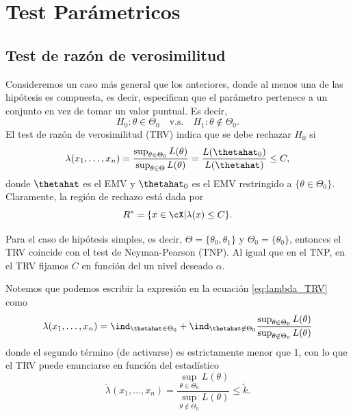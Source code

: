 \section{Test Parámetricos}

\subsection{Test de razón de verosimilitud} 
\label{sub:test_de_RV}

Consideremos un caso más general que los anteriores, donde al menos una de las hipótesis es compuesta, es decir, especifican que el parámetro pertenece a un conjunto en vez de tomar un valor puntual. Es decir, 
\begin{equation}
		H_0:\theta \in\Theta_0\quad \text{v.s.}\quad H_1:\theta \notin\Theta_0.
	\end{equation}
El test de razón de verosimilitud (TRV) indica que se debe rechazar $H_0$ si 
\begin{equation}
	\label{eq:lambda_TRV}
	\lambda(x_1,\ldots,x_n) = \frac{\sup_{\theta\in\Theta_0}L(\theta)}{\sup_{\theta\in\Theta}L(\theta)}
							= \frac{L(\thetahat_0)}{L(\thetahat)}\leq C,
\end{equation}
donde $\thetahat$ es el EMV y $\thetahat_0$ es el EMV restringido a $\{\theta\in\Theta_0\}$. Claramente, la región de rechazo está dada por 
\begin{equation}
	R^* = \{x\in\cX|\lambda(x)\leq C\}.
\end{equation}
\begin{remark}
	Para el caso de hipótesis simples, es decir, $\Theta = \{\theta_0,\theta_1\}$ y $\Theta_0 = \{\theta_0\}$, entonces el TRV coincide con el test de Neyman-Pearson (TNP). Al igual que en el TNP, en el TRV fijamos $C$ en función del un nivel deseado $\alpha$. 
\end{remark}


\begin{remark}
	Notemos que podemos escribir la expresión en la ecuación \eqref{eq:lambda_TRV} como 
	\begin{equation}
		\lambda(x_1,\ldots,x_n) =  \ind_{\thetahat\in\Theta_0} + \ind_{\thetahat\not\in\Theta_0} \frac{\sup_{\theta\in\Theta_0}L(\theta)}{\sup_{\theta\not\in\Theta_0}L(\theta)}
	\end{equation}
	donde el segundo término (de activarse) es estrictamente menor que 1, con lo que el TRV puede enunciarse en función del estadístico 
	\begin{equation}
		\tilde{\lambda}(x_1,\ldots,x_n) = \frac{\sup_{\theta\in\Theta_0}L(\theta)}{\sup_{\theta\not\in\Theta_0}L(\theta)} \leq \tilde{k}.
	\end{equation}
\end{remark}


